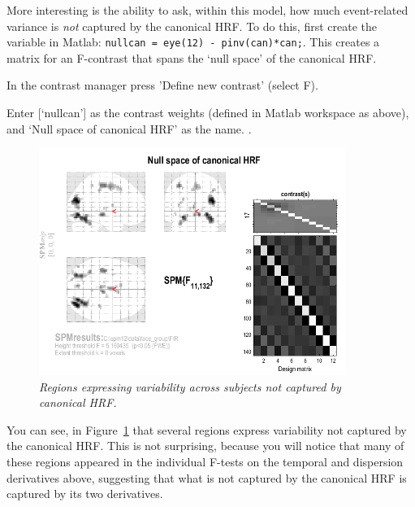 More interesting is the ability to ask, within this model, how much event-related variance is {\em not} captured by the canonical HRF. To do this, first create the variable in Matlab: \verb!nullcan = eye(12) - pinv(can)*can;!.
This creates a matrix for an F-contrast that spans the `null space' of the canonical HRF.
\bi
\item{In the contrast manager press 'Define new contrast' (select F).}
\item{Enter [`nullcan'] as the contrast weights (defined in Matlab workspace as above), and `Null space of canonical HRF' as the name.}
\ei
\cite{daniel_hbf2}.
\begin{figure}
\begin{center}
\includegraphics[width=100mm]{nullcan}
\caption{\em Regions expressing variability across subjects not captured by canonical HRF. \label{nullcan}}
\end{center}
\end{figure}
You can see, in Figure~\ref{nullcan} that several regions express variability not captured by the canonical HRF. This is not surprising, because you will notice that many of these regions appeared in the individual F-tests on the temporal and dispersion derivatives above, suggesting that what is not captured by the canonical HRF is captured by its two derivatives.

